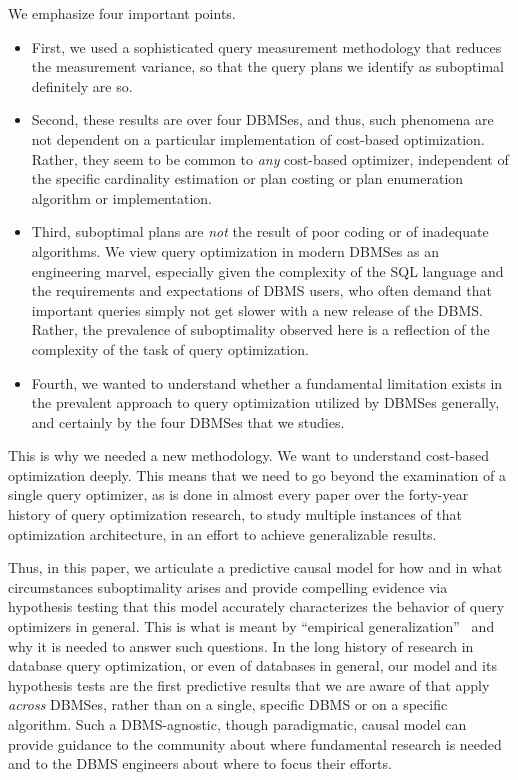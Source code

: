 \documentclass[prodmode,acmtods]{acmsmall}
\begin{document}
We emphasize four important points.
\begin{itemize}
\item First, we used a sophisticated query
measurement methodology that reduces the measurement variance, so that the
query plans we identify as suboptimal definitely are so.
\item Second, these
results are over four \hbox{DBMSes}, and thus, such phenomena are not dependent on
a particular implementation of cost-based optimization. Rather, they seem to
be common to {\em any} cost-based optimizer, independent of the specific
cardinality \hbox{estimation} or plan costing or plan enumeration algorithm or
implementation.
\item Third, suboptimal plans are {\em not} the result of poor
coding or of inadequate algorithms. We view query optimization in modern
\hbox{DBMSes} as an engineering marvel, especially given the complexity of the SQL
language and the requirements and expectations of \hbox{DBMS} users, who often
demand that important queries simply not get slower with a new release of
the \hbox{DBMS}. Rather, the prevalence of suboptimality observed here is a
reflection of the complexity of the task of query optimization.
\item Fourth, we wanted to understand whether a fundamental
limitation exists in the prevalent approach to query optimization utilized
by DBMSes generally, and certainly by the four DBMSes that we studies.
\end{itemize}

This is why we needed a new methodology. We want to understand
cost-based optimization deeply. This means that we need to go beyond the
examination of a single query optimizer, as is done in almost every paper
over the forty-year history of query optimization research, to study multiple instances of
that optimization architecture, in an effort to achieve generalizable
results.

Thus, in this paper,
we articulate a predictive causal model for how
and in what circumstances suboptimality arises and provide compelling
evidence via \hbox{hypothesis} testing that this model accurately characterizes the
\hbox{behavior} of query optimizers in general. This is what is meant by ``empirical
generalization''~\cite{cohenbook} and why it is needed to answer such questions. In
  the long history of research in database query optimization, or even of
  databases in general, our model and its hypothesis tests are the first
  predictive results that we are aware of that apply {\em across}
  \hbox{DBMSes}, rather than on a single, specific \hbox{DBMS} or on a
  specific algorithm. Such a DBMS-agnostic, though paradigmatic, causal model can
\hbox{provide} guidance to the community about where fundamental research is needed
and to the \hbox{DBMS} engineers about where to focus their efforts.
\end{document}
